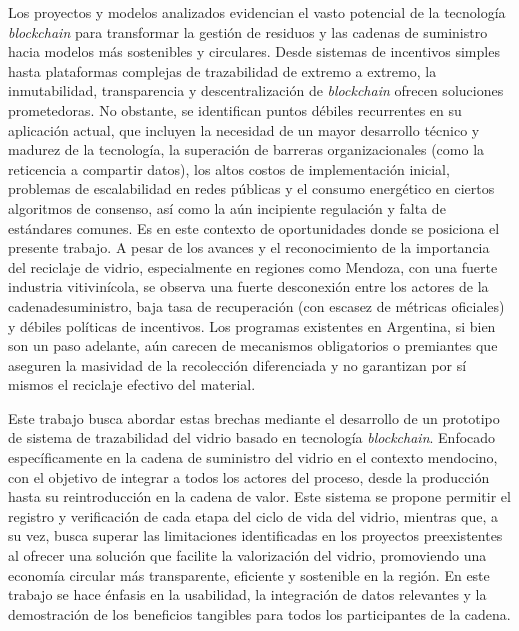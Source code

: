 Los proyectos y modelos analizados evidencian el vasto potencial de la tecnología \textit{blockchain} para transformar la gestión de residuos y las cadenas de suministro hacia modelos más sostenibles y circulares. Desde sistemas de incentivos simples hasta plataformas complejas de trazabilidad de extremo a extremo, la inmutabilidad, transparencia y descentralización de \textit{blockchain} ofrecen soluciones prometedoras. No obstante, se identifican puntos débiles recurrentes en su aplicación actual, que incluyen la necesidad de un mayor desarrollo técnico y madurez de la tecnología, la superación de barreras organizacionales (como la reticencia a compartir datos), los altos costos de implementación inicial, problemas de escalabilidad en redes públicas y el consumo energético en ciertos algoritmos de consenso, así como la aún incipiente regulación y falta de estándares comunes. Es en este contexto de oportunidades donde se posiciona el presente trabajo. A pesar de los avances y el reconocimiento de la importancia del reciclaje de vidrio, especialmente en regiones como Mendoza, con una fuerte industria vitivinícola, se observa una fuerte desconexión entre los actores de la \gls{cadenadesuministro}, baja tasa de recuperación (con escasez de métricas oficiales) y débiles políticas de incentivos. Los programas existentes en Argentina, si bien son un paso adelante, aún carecen de mecanismos obligatorios o premiantes que aseguren la masividad de la recolección diferenciada y no garantizan por sí mismos el reciclaje efectivo del material.

Este trabajo busca abordar estas brechas mediante el desarrollo de un prototipo de sistema de trazabilidad del vidrio basado en tecnología \textit{blockchain}. Enfocado específicamente en la cadena de suministro del vidrio en el contexto mendocino, con el objetivo de integrar a todos los actores del proceso, desde la producción hasta su reintroducción en la cadena de valor. Este sistema se propone permitir el registro y verificación de cada etapa del ciclo de vida del vidrio, mientras que, a su vez, busca superar las limitaciones identificadas en los proyectos preexistentes al ofrecer una solución que facilite la valorización del vidrio, promoviendo una economía circular más transparente, eficiente y sostenible en la región. En este trabajo se hace énfasis en la usabilidad, la integración de datos relevantes y la demostración de los beneficios tangibles para todos los participantes de la cadena.
